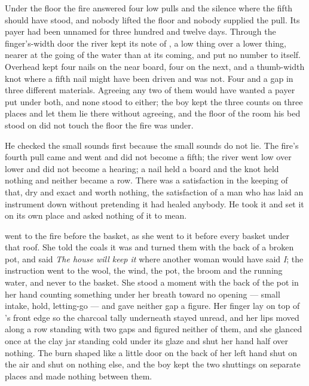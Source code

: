 \scenebreak

Under the floor the fire answered four low pulls and the silence where the fifth should have stood, and nobody lifted the floor and nobody supplied the pull. Its payer had been unnamed for three hundred and twelve days. Through the finger's-width door the river kept its note of , a low thing over a lower thing, nearer at the going of the water than at its coming, and put no number to itself. Overhead  kept four nails on the near board, four on the next, and a thumb-width knot where a fifth nail might have been driven and was not. Four and a gap in three different materials. Agreeing any two of them would have wanted a payer put under both, and none stood to either; the boy kept the three counts on three places and let them lie there without agreeing, and the floor of the room his bed stood on did not touch the floor the fire was under.

He checked the small sounds first because the small sounds do not lie. The fire's fourth pull came and went and did not become a fifth; the river went low over lower and did not become a hearing; a nail held a board and the knot held nothing and neither became a row. There was a satisfaction in the keeping of that, dry and exact and worth nothing, the satisfaction of a man who has laid an instrument down without pretending it had healed anybody. He took it and set it on its own place and asked nothing of it to mean.

\scenebreak

 went to the fire before the basket, as she went to it before every basket under that roof. She told the coals it was  and turned them with the back of a broken pot, and said \emph{The house will keep it} where another woman would have said \emph{I}; the instruction went to the wool, the wind, the pot, the broom and the running water, and never to the basket. She stood a moment with the back of the pot in her hand counting something under her breath toward no opening --- small intake, hold, letting-go --- and gave neither gap a figure. Her finger lay on top of 's front edge so the charcoal tally underneath stayed unread, and her lips moved along a row standing with two gaps and figured neither of them, and she glanced once at the clay jar standing cold under its glaze and shut her hand half over nothing. The burn shaped like a little door on the back of her left hand shut on the air and shut on nothing else, and the boy kept the two shuttings on separate places and made nothing between them.

